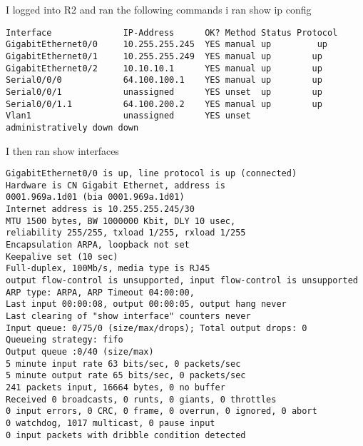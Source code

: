 \documentclass[../EngineeringJournal_CDavis.tex]{subfiles}
\begin{document}


I logged into R2 and ran the following commands 
  i ran show ip config

\begin{mdframed}
\scriptsize
\begin{verbatim}
Interface              IP-Address      OK? Method Status Protocol 
GigabitEthernet0/0     10.255.255.245  YES manual up 	     up 
GigabitEthernet0/1     10.255.255.249  YES manual up        up 
GigabitEthernet0/2     10.10.10.1      YES manual up        up 
Serial0/0/0            64.100.100.1    YES manual up        up 
Serial0/0/1            unassigned      YES unset  up        up 
Serial0/0/1.1          64.100.200.2    YES manual up        up 
Vlan1                  unassigned      YES unset
administratively down down
\end{verbatim}
\normalsize
\end{mdframed}

I then ran  show interfaces
\begin{mdframed}
\scriptsize
\begin{verbatim}
GigabitEthernet0/0 is up, line protocol is up (connected)
Hardware is CN Gigabit Ethernet, address is 
0001.969a.1d01 (bia 0001.969a.1d01)
Internet address is 10.255.255.245/30
MTU 1500 bytes, BW 1000000 Kbit, DLY 10 usec,
reliability 255/255, txload 1/255, rxload 1/255
Encapsulation ARPA, loopback not set
Keepalive set (10 sec)
Full-duplex, 100Mb/s, media type is RJ45
output flow-control is unsupported, input flow-control is unsupported
ARP type: ARPA, ARP Timeout 04:00:00, 
Last input 00:00:08, output 00:00:05, output hang never
Last clearing of "show interface" counters never
Input queue: 0/75/0 (size/max/drops); Total output drops: 0
Queueing strategy: fifo
Output queue :0/40 (size/max)
5 minute input rate 63 bits/sec, 0 packets/sec
5 minute output rate 65 bits/sec, 0 packets/sec
241 packets input, 16664 bytes, 0 no buffer
Received 0 broadcasts, 0 runts, 0 giants, 0 throttles
0 input errors, 0 CRC, 0 frame, 0 overrun, 0 ignored, 0 abort
0 watchdog, 1017 multicast, 0 pause input
0 input packets with dribble condition detected

\end{verbatim}
\normalsize
\end{mdframed}
\end{document}
